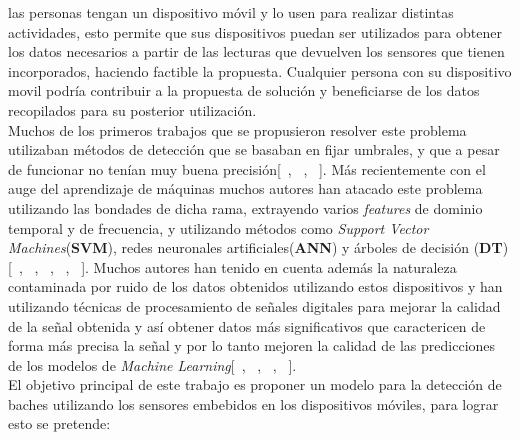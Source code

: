 las personas tengan un dispositivo móvil y lo usen para realizar distintas actividades, esto permite que sus dispositivos puedan ser utilizados
para obtener los datos necesarios a partir de las lecturas que devuelven los sensores que tienen incorporados, haciendo factible la propuesta. 
Cualquier persona con su dispositivo movil podría  contribuir a la propuesta de solución y beneficiarse de los datos recopilados  para su posterior
utilizaci\'{o}n.\\ 
\indent Muchos de los primeros trabajos que se propusieron resolver este problema utilizaban métodos de detección que se basaban en fijar
umbrales, y que a pesar de funcionar no tenían muy buena precisión[~\parencite{eriksson2008pothole}, ~\parencite{mohan2008nericell},
~\parencite{mednis2011real}]. Más recientemente con el auge del aprendizaje de máquinas muchos autores han atacado este problema
utilizando las bondades de dicha rama, extrayendo varios \emph{features} de dominio temporal y de frecuencia, y utilizando métodos
como \emph{Support Vector Machines}(\textbf{SVM}), redes neuronales artificiales(\textbf{ANN}) y árboles de decisión (\textbf{DT})
[~\parencite{el2018towards}, ~\parencite{seraj2015roads}, ~\parencite{gonzalez2017learning}, ~\parencite{zheng2020fused},
~\parencite{perttunen2011distributed}]. Muchos autores han tenido en cuenta además la naturaleza contaminada por ruido de los datos
obtenidos utilizando estos dispositivos y han utilizando técnicas de procesamiento de señales digitales para mejorar la calidad de
la señal obtenida y así obtener datos más significativos que caractericen de forma más precisa la señal y por lo tanto mejoren la
calidad de las predicciones de los modelos de \emph{Machine Learning}[~\parencite{el2018towards}, ~\parencite{zheng2020fused},
~\parencite{perttunen2011distributed}, ~\parencite{gonzalez2017learning}].\\
\indent El objetivo principal de este trabajo es proponer un modelo para la detección de baches utilizando los sensores embebidos en los
dispositivos móviles, para lograr esto se pretende:

